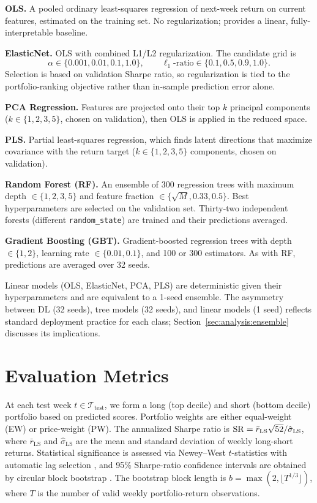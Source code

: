 \textbf{OLS.}
A pooled ordinary least-squares regression of next-week return on current
features, estimated on the training set.
No regularization; provides a linear, fully-interpretable baseline.

\textbf{ElasticNet.}
OLS with combined L1/L2 regularization.
The candidate grid is
\[
\alpha \in \{0.001, 0.01, 0.1, 1.0\}, \qquad
\ell_1\text{-ratio} \in \{0.1, 0.5, 0.9, 1.0\}.
\]
Selection is based on validation Sharpe ratio, so regularization is tied to
the portfolio-ranking objective rather than in-sample prediction error alone.

\textbf{PCA Regression.}
Features are projected onto their top $k$ principal components
($k \in \{1, 2, 3, 5\}$, chosen on validation), then OLS is applied
in the reduced space.

\textbf{PLS.}
Partial least-squares regression, which finds latent directions that
maximize covariance with the return target
($k \in \{1, 2, 3, 5\}$ components, chosen on validation).

\textbf{Random Forest (RF).}
An ensemble of 300 regression trees with maximum depth $\in \{1,2,3,5\}$
and feature fraction $\in \{\sqrt{M}, 0.33, 0.5\}$.
Best hyperparameters are selected on the validation set.
Thirty-two independent forests (different \texttt{random\_state}) are trained
and their predictions averaged.

\textbf{Gradient Boosting (GBT).}
Gradient-boosted regression trees with depth $\in \{1, 2\}$,
learning rate $\in \{0.01, 0.1\}$, and 100 or 300 estimators.
As with RF, predictions are averaged over 32 seeds.

Linear models (OLS, ElasticNet, PCA, PLS) are deterministic given their
hyperparameters and are equivalent to a 1-seed ensemble.
The asymmetry between DL (32 seeds), tree models (32 seeds), and linear
models (1 seed) reflects standard deployment practice for each class;
Section~\ref{sec:analysis:ensemble} discusses its implications.

\section{Evaluation Metrics}
\label{sec:method:eval}

At each test week $t \in \mathcal{T}_{\text{test}}$, we form a long
(top decile) and short (bottom decile) portfolio based on predicted scores.
Portfolio weights are either equal-weight (EW) or price-weight (PW).
The annualized Sharpe ratio is
$\mathrm{SR} = \bar{r}_\text{LS} \sqrt{52} / \hat{\sigma}_\text{LS}$,
where $\bar{r}_\text{LS}$ and $\hat{\sigma}_\text{LS}$ are the mean and
standard deviation of weekly long-short returns.
Statistical significance is assessed via Newey--West $t$-statistics
\citep{newey1987simple} with automatic lag selection \citep{newey1994automatic},
and 95\% Sharpe-ratio confidence intervals are obtained by circular block
bootstrap \citep{politis1994stationary}.
The bootstrap block length is $b=\max(2,\lfloor T^{1/3}\rfloor)$, where
$T$ is the number of valid weekly portfolio-return observations.
